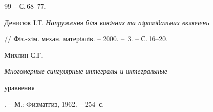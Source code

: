 \begin{thebibliography}{99}
-- С.\,68--77. 




Денисюк I.Т. {\em Напруження бiля конiчних та пiрамiдальних включень} 


// Фiз.-хiм. механ. матерiалiв. -- 2000. -- \No\,3. -- С.\,16--20. 




Михлин С.Г. {\em Многомерные сингулярные интегралы и интегральные  


уравнения}. -- М.: Физматгиз, 1962. -- 254~с. 


 


\end{thebibliography} 


 


\vskip 0.5cm 


 








 


\label{end} 


 


